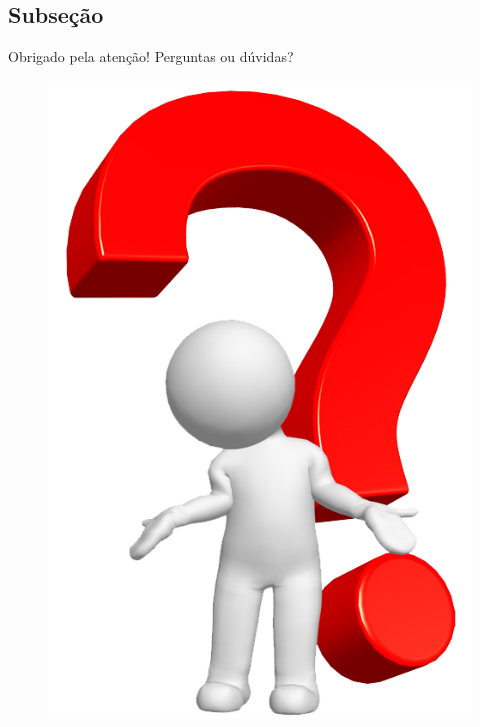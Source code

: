 \documentclass{beamer}
\begin{document}
\subsection{Subseção}
\begin{frame}
	\begin{block}{}
		\justify \center Obrigado pela atenção!
		\center \alert{Perguntas ou dúvidas?}
	\end{block}
	\begin{figure}[h]
		\centering
		\includegraphics[scale=0.15]{figs/questions.png}
	\end{figure}	
\end{frame}
\end{document}
